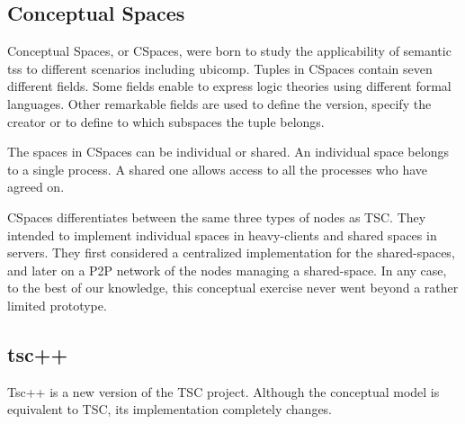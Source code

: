 \subsection{Conceptual Spaces}

Conceptual Spaces, or CSpaces, were born to study the applicability of semantic \aclp{ts} to different scenarios including \acl{ubicomp}.
Tuples in CSpaces contain seven different fields.
Some fields enable to express logic theories using different formal languages.
Other remarkable fields are used to define the version, specify the creator or to define to which subspaces the tuple belongs. %

The spaces in CSpaces can be individual or shared.
An individual space belongs to a single process.
A shared one allows access to all the processes who have agreed on.

CSpaces differentiates between the same three types of nodes as TSC.
They intended to implement individual spaces in heavy-clients and shared spaces in servers.
They first considered a centralized implementation for the shared-spaces, %
and later on a P2P network of the nodes managing a shared-space. %
In any case, to the best of our knowledge, this conceptual exercise never went beyond a rather limited prototype.



\subsection{tsc++}

Tsc++ \citep{krummenacher_open_2009,blunder_distributed_2009} is a new version of the TSC project.
Although the conceptual model is equivalent to TSC, its implementation completely changes.


